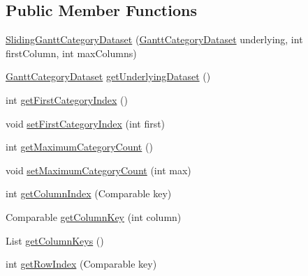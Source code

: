\subsection*{Public Member Functions}
\begin{DoxyCompactItemize}
\item 
\mbox{\hyperlink{classorg_1_1jfree_1_1data_1_1gantt_1_1_sliding_gantt_category_dataset_ac198107e31100e788859a0ed636c6b33}{Sliding\+Gantt\+Category\+Dataset}} (\mbox{\hyperlink{interfaceorg_1_1jfree_1_1data_1_1gantt_1_1_gantt_category_dataset}{Gantt\+Category\+Dataset}} underlying, int first\+Column, int max\+Columns)
\item 
\mbox{\hyperlink{interfaceorg_1_1jfree_1_1data_1_1gantt_1_1_gantt_category_dataset}{Gantt\+Category\+Dataset}} \mbox{\hyperlink{classorg_1_1jfree_1_1data_1_1gantt_1_1_sliding_gantt_category_dataset_a80cd50cbf611e7a3f4befd7d3247c4e8}{get\+Underlying\+Dataset}} ()
\item 
int \mbox{\hyperlink{classorg_1_1jfree_1_1data_1_1gantt_1_1_sliding_gantt_category_dataset_a01a38818aad9ad8d78ea3554f10bb6b8}{get\+First\+Category\+Index}} ()
\item 
void \mbox{\hyperlink{classorg_1_1jfree_1_1data_1_1gantt_1_1_sliding_gantt_category_dataset_a31cd1a806e9a0a080fca4161f291c889}{set\+First\+Category\+Index}} (int first)
\item 
int \mbox{\hyperlink{classorg_1_1jfree_1_1data_1_1gantt_1_1_sliding_gantt_category_dataset_a1d9df7bd70883ffa80bd7b5ea043757f}{get\+Maximum\+Category\+Count}} ()
\item 
void \mbox{\hyperlink{classorg_1_1jfree_1_1data_1_1gantt_1_1_sliding_gantt_category_dataset_aacd296d9a9f6ce68329017a3d6d73567}{set\+Maximum\+Category\+Count}} (int max)
\item 
int \mbox{\hyperlink{classorg_1_1jfree_1_1data_1_1gantt_1_1_sliding_gantt_category_dataset_a4f7ede857998defbef577b37c3d62bc9}{get\+Column\+Index}} (Comparable key)
\item 
Comparable \mbox{\hyperlink{classorg_1_1jfree_1_1data_1_1gantt_1_1_sliding_gantt_category_dataset_a1030967720c6585c3a46acf80872ce3c}{get\+Column\+Key}} (int column)
\item 
List \mbox{\hyperlink{classorg_1_1jfree_1_1data_1_1gantt_1_1_sliding_gantt_category_dataset_a5a6d9404ac2413409fe2c046a8c758df}{get\+Column\+Keys}} ()
\item 
int \mbox{\hyperlink{classorg_1_1jfree_1_1data_1_1gantt_1_1_sliding_gantt_category_dataset_add3562d698dc54aa8a80555690172816}{get\+Row\+Index}} (Comparable key)

\end{DoxyCompactItemize}
